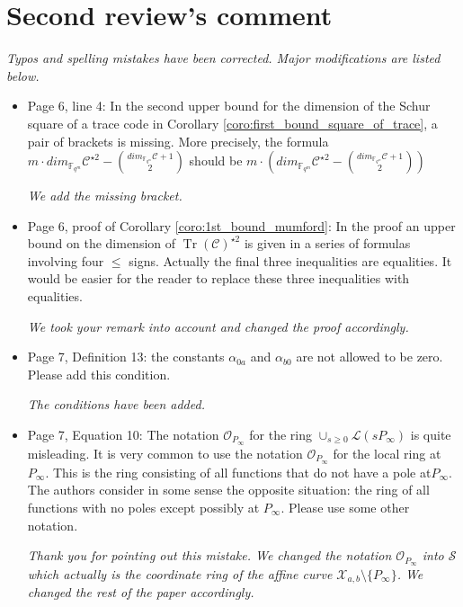 \documentclass[12pt,a4paper]{amsart}
\DeclareMathOperator{\trace}{Tr}
\newcommand{\fqm}{\mathbb{F}_{q^m}}
\newcommand{\calC}{\mathcal{C}}
\newcommand{\calX}{\mathcal{X}}
\newcommand{\Tr}[1]{\trace\!\left(#1\right)}
\begin{document}
\section*{Second review's comment}

\textit{Typos and spelling mistakes have been corrected. Major modifications are listed below.} \\

\begin{itemize}

\item Page 6, line 4: In the second upper bound for the dimension of the Schur square of a trace code in Corollary \ref{coro:first_bound_square_of_trace}, a pair of brackets is missing. More precisely, the formula $m \cdot dim_{\fqm} \calC^{\star 2}-\binom{dim_{\fqm}\calC+1}{2}$ should be $m \cdot \left( dim_{\fqm} \calC^{\star 2} -\binom{dim_{\fqm} \calC+1}{2}\right)$

\textit{We add the missing bracket.}

\item Page 6, proof of Corollary \ref{coro:1st_bound_mumford}: In the proof an upper bound on the dimension of $\Tr{\calC}^{\star 2}$ is given in a series of formulas involving four $\le$ signs. Actually the final three inequalities are equalities. It would be easier for the reader to replace these three inequalities with equalities.

\textit{We took your remark into account and changed the proof accordingly.}


\item Page 7, Definition 13: the constants $\alpha_{0a}$ and $\alpha_{b0}$ are not allowed to be zero. Please add this condition.

\textit{The conditions have been added.} 

\item Page 7, Equation 10: The notation $\mathcal{O}_{P_\infty}$ for the ring $\cup_{s \ge 0} \mathcal{L}(sP_\infty)$ is quite misleading. It is very common to use the notation $\mathcal{O}_{P_\infty}$ for the local ring at $P_\infty$. This is the ring consisting of all functions that do not have a pole at$ P_\infty$. The authors consider in some sense the opposite situation: the ring of all functions with no poles except possibly at $P_\infty$. Please use some other notation.

\textit{Thank you for pointing out this mistake. We changed the notation $\mathcal{O}_{P_\infty}$ into $\mathcal{S}$ which actually is the coordinate ring of the affine curve $\calX_{a,b} \setminus \{P_\infty\}$. We changed the rest of the paper accordingly.}


\end{itemize}
\end{document}

